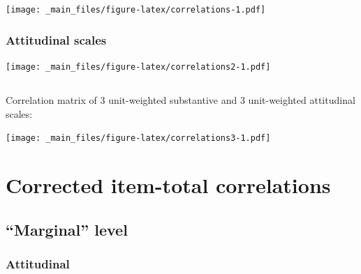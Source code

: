 \documentclass[
]{book}
\begin{document}
\texttt{[image: \_main\_files/figure-latex/correlations-1.pdf]}

\hypertarget{attitudinal-scales}{%
\subsection{Attitudinal scales}\label{attitudinal-scales}}

\texttt{[image: \_main\_files/figure-latex/correlations2-1.pdf]}

\hypertarget{section}{%
\section*{}\label{section}}

Correlation matrix of 3 unit-weighted substantive and 3 unit-weighted attitudinal scales:

\texttt{[image: \_main\_files/figure-latex/correlations3-1.pdf]}

\hypertarget{rdrops}{%
\chapter{Corrected item-total correlations}\label{rdrops}}

\hypertarget{marginal-level}{%
\section{``Marginal'' level}\label{marginal-level}}

\hypertarget{attitudinal}{%
\subsection{Attitudinal}\label{attitudinal}}
\end{document}
